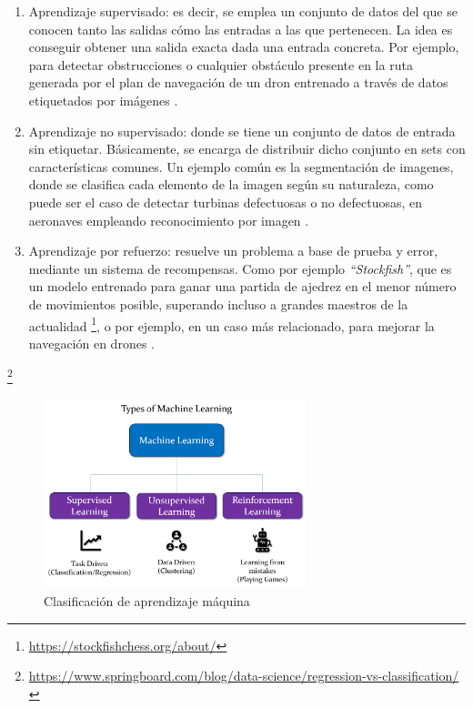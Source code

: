 \begin{enumerate}
	\item Aprendizaje supervisado: es decir, se emplea un conjunto de datos del que se conocen tanto las salidas cómo las entradas a las que pertenecen. La idea es conseguir obtener una salida exacta dada una entrada concreta. Por ejemplo, para detectar obstrucciones o cualquier obstáculo presente en la ruta generada por el plan de navegación de un dron entrenado a través de datos etiquetados por imágenes \cite{christl2020visionbased}.
	\item Aprendizaje no supervisado: donde se tiene un conjunto de datos de entrada sin etiquetar. Básicamente, se encarga de distribuir dicho conjunto en sets con características comunes. Un ejemplo común es la segmentación de imagenes, donde se clasifica cada elemento de la imagen según su naturaleza, como puede ser el caso de detectar turbinas defectuosas o no defectuosas, en aeronaves empleando reconocimiento por imagen \cite{wang2019unsupervised}.
    \item Aprendizaje por refuerzo: resuelve un problema a base de prueba y error, mediante un sistema de recompensas. Como por ejemplo \emph{``Stockfish''}, que es un modelo entrenado para ganar una partida de ajedrez en el menor número de movimientos posible, superando incluso a grandes maestros de la actualidad \footnote[15]{\url{https://stockfishchess.org/about/}}, o por ejemplo, en un caso más relacionado, para mejorar la navegación en drones \cite{electronics10090999}.
\end{enumerate} \footnote[16]{\url{https://www.springboard.com/blog/data-science/regression-vs-classification/}}

\begin{figure} [tp]
	\begin{center}
	\includegraphics[height=5.5cm]{imagenes/cap1/8_AI_types.png}
	\end{center}
	\caption[Clasificación de aprendizaje máquina]{Clasificación de aprendizaje máquina}
	\label{fig:ai_types}
\end{figure}

